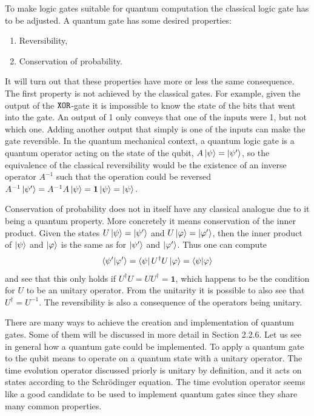 To make logic gates suitable for quantum computation the classical logic gate has to be adjusted. A quantum gate has some desired properties:
\begin{enumerate}
\item Reversibility,
\item Conservation of probability.
\end{enumerate}
It will turn out that these properties have more or less the same consequence. The first property is not achieved by the classical gates. For example, given the output of the ${\tt XOR}$-gate  it is impossible to know the state of the bits that went into the gate. An output of 1 only conveys that one of the inputs were 1, but not which one. Adding another output that simply is one of the inputs can make the gate reversible. In the quantum mechanical context, a quantum logic gate is a quantum operator acting on the state of the qubit, $A\ket{\psi} = \ket{\psi'}$, so the equivalence of the classical reversibility would be the existence of an inverse operator $A^{-1}$ such that the operation could be reversed $A^{-1}\ket{\psi'} = A^{-1}A\ket{\psi} = \mathbf{1}\ket{\psi} = \ket{\psi}.$

Conservation of probability does not in itself have any classical analogue due to it being a quantum property. More concretely it means conservation of the inner product. Given the states $U\ket{\psi} = \ket{\psi'}$ and $U\ket{\varphi} = \ket{\varphi'}$, then the inner product of $\ket{\psi}$ and $\ket{\varphi}$ is the same as for $\ket{\psi'}$ and $\ket{\varphi'}$. Thus one can compute
\begin{equation}
\bra{\psi'}\ket{\varphi'} = \bra{\psi}U^\dagger U\ket{\varphi} = \bra{\psi}\ket{\varphi}
\end{equation}
and see that this only holds if $U^\dagger U = UU^\dagger = \mathbf{1}$, which happens to be the condition for $U$ to be an unitary operator. From the unitarity it is possible to also see that $U^\dagger = U^{-1}$. The reversibility is also a consequence of the operators being unitary.


There are many ways to achieve the creation and implementation of quantum gates. Some of them will be discussed in more detail in Section 2.2.6. Let us see in general how a quantum gate could be implemented. To apply a quantum gate to the qubit means to operate on a quantum state with a unitary operator. The time evolution operator discussed priorly is unitary by definition, and it acts on states according to the Schrödinger equation. The time evolution operator seems like a good candidate to be used to implement quantum gates since they share many common properties.


